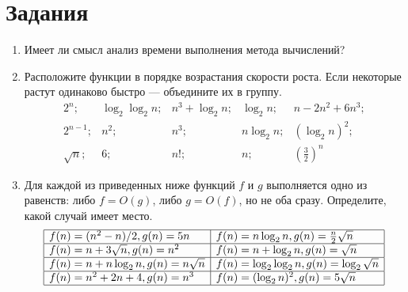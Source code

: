 \section*{Задания}

\begin{enumerate}
    \item Имеет ли смысл анализ времени выполнения метода вычислений?
    
    \item Расположите функции в порядке возрастания скорости роста. Если некоторые растут одинаково быстро --- объедините их в группу.
    \[
        \begin{array}{lllll}
            2^n;        &\log_2\log_2n; &n^3+\log_2n;   &\log_2n;   &n-2n^2+6n^3;\\
            2^{n-1};    &n^2;           &n^3;           &n\log_2n;  &(\log_2n)^2;\\
            \sqrt{n};   &6;             &n!;            &n;         &\left(\frac{3}{2}\right)^n
        \end{array}
    \]
    
    \item Для каждой из приведенных ниже функций $f$ и $g$ выполняется одно из равенств: либо $f=O(g)$, либо $g=O(f)$, но не оба сразу. Определите, какой случай имеет место.
    \[
        \begin{array}{|l|l|}
                                                                                        \hline
            f(n)=(n^2-n)/2,g(n)=5n          &f(n)=n\log_2n,g(n)=\frac{n}{2}\sqrt{n} \\  \hline
            f(n)=n+3\sqrt{n},g(n)=n^2       &f(n)=n+\log_2n,g(n)=\sqrt{n}           \\  \hline
            f(n)=n+n\log_2n,g(n)=n\sqrt{n}  &f(n)=\log_2\log_2n,g(n)=\log_2\sqrt{n} \\  \hline
            f(n)=n^2+2n+4,g(n)=n^3          &f(n)=(\log_2n)^2,g(n)=5\sqrt{n}        \\  \hline
        \end{array}
    \]
    

\end{enumerate}
